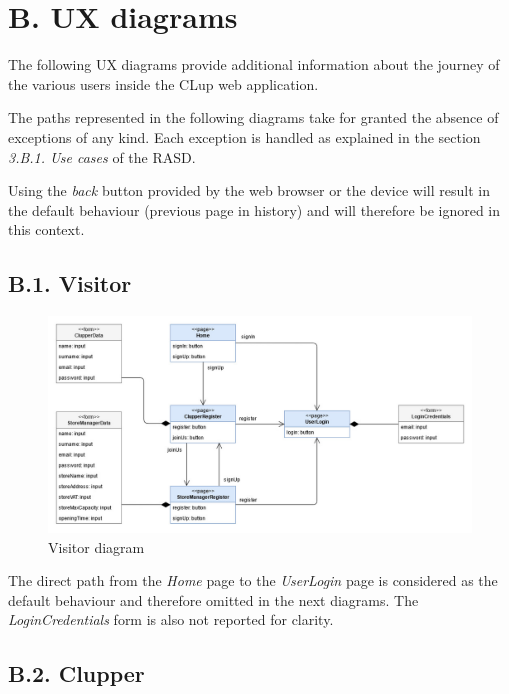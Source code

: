 \section{B. UX diagrams}

The following UX diagrams provide additional information about the journey of the various users inside the CLup web application.

The paths represented in the following diagrams take for granted the absence of exceptions of any kind. Each exception is handled as explained in the section \emph{3.B.1. Use cases} of the RASD.

Using the \emph{back} button provided by the web browser or the device will result in the default behaviour (previous page in history) and will therefore be ignored in this context.

\subsection{B.1. Visitor}

\begin{figure}[H]
\centering
\includegraphics{ux_diagrams/ux_visitor}
\caption{Visitor diagram}
\end{figure}

The direct path from the \emph{Home} page to the \emph{UserLogin} page is considered as the default behaviour and therefore omitted in the next diagrams. The \emph{LoginCredentials} form is also not reported for clarity.

\subsection{B.2. Clupper}

